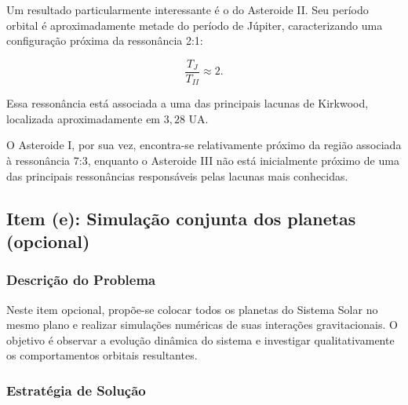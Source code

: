 \documentclass[12pt,a4paper]{article}
\begin{document}
Um resultado particularmente interessante é o do Asteroide II. Seu período orbital é aproximadamente metade do período de Júpiter, caracterizando uma configuração próxima da ressonância 2:1:

\begin{equation}
    \frac{T_J}{T_{II}}\approx2.
\end{equation}

Essa ressonância está associada a uma das principais lacunas de Kirkwood, localizada aproximadamente em $3,28$ UA.

O Asteroide I, por sua vez, encontra-se relativamente próximo da região associada à ressonância 7:3, enquanto o Asteroide III não está inicialmente próximo de uma das principais ressonâncias responsáveis pelas lacunas mais conhecidas.

\subsection{Item (e): Simulação conjunta dos planetas (opcional)}

\subsubsection{Descrição do Problema}

Neste item opcional, propõe-se colocar todos os planetas do Sistema Solar no mesmo plano e realizar simulações numéricas de suas interações gravitacionais. O objetivo é observar a evolução dinâmica do sistema e investigar qualitativamente os comportamentos orbitais resultantes.

\subsubsection{Estratégia de Solução}
\end{document}
